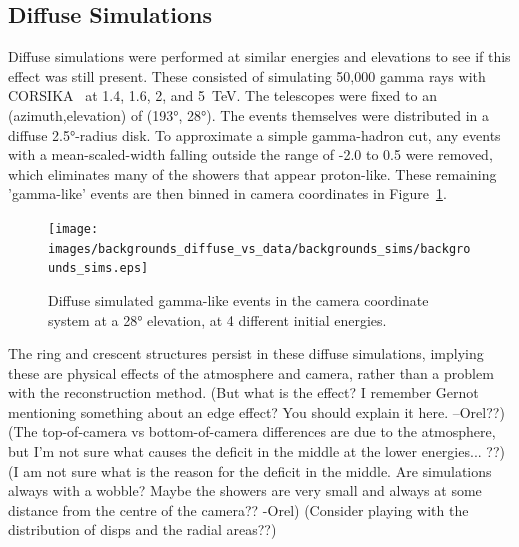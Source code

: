   \FloatBarrier

  \subsection{Diffuse Simulations}\label{subsubsec:diffusesims}
    Diffuse simulations were performed at similar energies and elevations to see if this effect was still present.
    These consisted of simulating 50,000 gamma rays with CORSIKA~\cite{corsika1998} at 1.4, 1.6, 2, and \SI{5}{\TeV}.
    The telescopes were fixed to an (azimuth,elevation) of (\ang{193}, \ang{28}).
    The events themselves were distributed in a diffuse \ang{2.5}-radius disk.
    To approximate a simple gamma-hadron cut, any events with a mean-scaled-width falling outside the range of -2.0 to 0.5 were removed, which eliminates many of the showers that appear proton-like.
    These remaining 'gamma-like' events are then binned in camera coordinates in Figure~\ref{fig:back_simdiffuse}.

    \begin{figure}[ht]
      \centering
      \texttt{[image: images/backgrounds\_diffuse\_vs\_data/backgrounds\_sims/backgrounds\_sims.eps]}
      \caption[Diffuse Simulated Backgrounds]{
        Diffuse simulated gamma-like events in the camera coordinate system at a \ang{28} elevation, at 4 different initial energies.
      }
      \label{fig:back_simdiffuse}
    \end{figure}

    The ring and crescent structures persist in these diffuse simulations, implying these are physical effects of the atmosphere and camera, rather than a problem with the reconstruction method.
    {\color{red}(But what is the effect? I remember Gernot mentioning something about an edge effect? You should explain it here. --Orel??)}
    {\color{red}(The top-of-camera vs bottom-of-camera differences are due to the atmosphere, but I'm not sure what causes the deficit in the middle at the lower energies... ??)}
    {\color{red}(I am not sure what is the reason for the deficit in the middle. Are simulations always with a wobble? Maybe the showers are very small and always at some distance from the centre of the camera?? -Orel)}
    {\color{red}(Consider playing with the distribution of disps and the radial areas??)}

